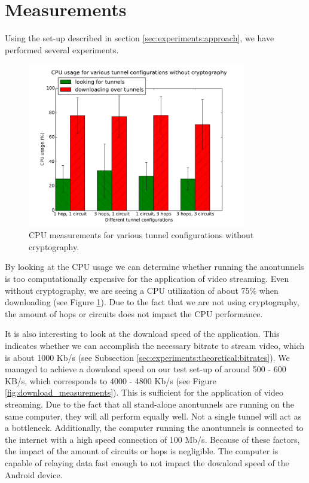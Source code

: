 \section{Measurements}
\label{sec:experiments:measurements}

Using the set-up described in section \ref{sec:experiments:approach}, we have performed several experiments.

\begin{figure}[t]
	\centering
	\includegraphics[width=0.85\textwidth]{graphics/cpu.pdf}
	\caption{CPU measurements for various tunnel configurations without cryptography.}
	\label{fig:cpu_measurements}
\end{figure}

By looking at the CPU usage we can determine whether running the anontunnels is too computationally expensive for the application of video streaming. Even without cryptography, we are seeing a CPU utilization of about 75\% when downloading (see Figure \ref{fig:cpu_measurements}). Due to the fact that we are not using cryptography, the amount of hops or circuits does not impact the CPU performance.

It is also interesting to look at the download speed of the application. This indicates whether we can accomplish the necessary bitrate to stream video, which is about 1000 Kb/s (see Subsection \ref{sec:experiments:theoretical:bitrates}). We managed to achieve a download speed on our test set-up of around 500 - 600 KB/s, which corresponds to 4000 - 4800 Kb/s (see Figure \ref{fig:download_measurements}). This is sufficient for the application of video streaming. Due to the fact that all stand-alone anontunnels are running on the same computer, they will all perform equally well. Not a single tunnel will act as a bottleneck. Additionally, the computer running the anontunnels is connected to the internet with a high speed connection of 100 Mb/s. Because of these factors, the impact of the amount of circuits or hops is negligible. The computer is capable of relaying data fast enough to not impact the download speed of the Android device.

